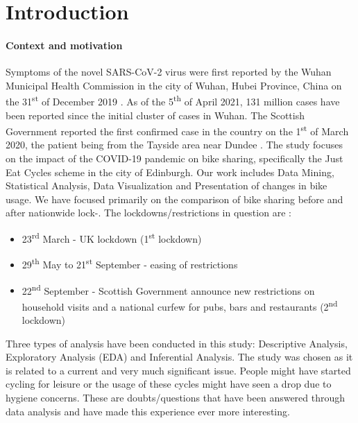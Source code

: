 \documentclass[11pt,a4paper]{article}
\begin{document}
\section{Introduction}
\vspace{-5mm}
\paragraph{Context and motivation}

Symptoms of the novel SARS-CoV-2 virus were first reported by the Wuhan Municipal Health Commission in the city of Wuhan, Hubei Province, China on the 31\textsuperscript{st} of December 2019 \cite{who_wuhan}. As of the 5\textsuperscript{th} of April 2021, 131 million cases have been reported since the initial cluster of cases in Wuhan. The Scottish Government reported the first confirmed case in the country on the 1\textsuperscript{st} of March 2020, the patient being from the Tayside area near Dundee \cite{tayside}. The study focuses on the impact of the COVID-19 pandemic on bike sharing, specifically the Just Eat Cycles scheme in the city of Edinburgh. Our work includes Data Mining, Statistical Analysis, Data Visualization and Presentation of changes in bike usage. We have focused primarily on the comparison of bike sharing before and after nationwide lock-. The lockdowns/restrictions in question are \cite{timeline}:
\begin{itemize}
    \item 23\textsuperscript{rd} March - UK lockdown (1\textsuperscript{st} lockdown)
    \item 29\textsuperscript{th} May to 21\textsuperscript{st} September - easing of restrictions
    \item 22\textsuperscript{nd} September - Scottish Government announce new restrictions on household visits and a national curfew for pubs, bars and restaurants (2\textsuperscript{nd} lockdown)
\end{itemize}
Three types of analysis have been conducted in this study: Descriptive Analysis, Exploratory Analysis (EDA) and Inferential Analysis. The study was chosen as it is related to a current and very much significant issue. People might have started cycling for leisure or the usage of these cycles might have seen a drop due to hygiene concerns. These are doubts/questions that have been answered through data analysis and have made this experience ever more interesting.
\vspace{-4mm}
\end{document}
